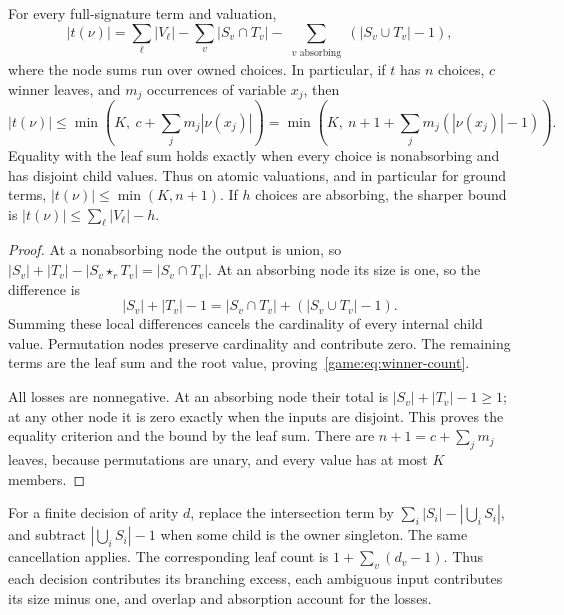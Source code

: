 \begin{proposition}\label{game:prop:winner-count}
For every full-signature term and valuation,
\begin{equation}\label{game:eq:winner-count}
 |t(\nu)|=
 \sum_{\ell}|V_\ell|
 -\sum_{v}|S_v\cap T_v|
 -\sum_{\substack{v\text{ absorbing}}}(|S_v\cup T_v|-1),
\end{equation}
where the node sums run over owned choices. In particular, if $t$ has
$n$ choices, $c$ winner leaves, and $m_j$ occurrences of variable $x_j$,
then
\begin{equation}\label{game:eq:winner-bound}
 |t(\nu)|\leq
 \min\left(K,\ c+\sum_jm_j|\nu(x_j)|\right)
 =\min\left(K,\ n+1+\sum_jm_j(|\nu(x_j)|-1)\right).
\end{equation}
Equality with the leaf sum holds exactly when every choice is
nonabsorbing and has disjoint child values. Thus on atomic valuations,
and in particular for ground terms, $|t(\nu)|\leq\min(K,n+1)$.
If $h$ choices are absorbing, the sharper bound is
$|t(\nu)|\leq\sum_\ell|V_\ell|-h$.
\end{proposition}
\begin{proof}
At a nonabsorbing node the output is union, so
$|S_v|+|T_v|-|S_v\star_r T_v|=|S_v\cap T_v|$.
At an absorbing node its size is one, so the difference is
\[
 |S_v|+|T_v|-1
 =|S_v\cap T_v|+(|S_v\cup T_v|-1).
\]
Summing these local differences cancels the cardinality of every
internal child value. Permutation nodes preserve cardinality and
contribute zero. The remaining terms are the leaf sum and the root
value, proving~\eqref{game:eq:winner-count}.

All losses are nonnegative. At an absorbing node their total is
$|S_v|+|T_v|-1\geq1$; at any other node it is zero exactly when
the inputs are disjoint. This proves the equality criterion and the
bound by the leaf sum. There are $n+1=c+\sum_jm_j$ leaves, because
permutations are unary, and every value has at most $K$ members.
\end{proof}

For a finite decision of arity $d$, replace the intersection term by
$\sum_i|S_i|-|\bigcup_iS_i|$, and subtract
$|\bigcup_iS_i|-1$ when some child is the owner singleton. The same
cancellation applies. The corresponding leaf count is
$1+\sum_v(d_v-1)$. Thus each decision contributes its branching
excess, each ambiguous input contributes its size minus one, and
overlap and absorption account for the losses.

